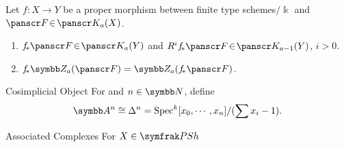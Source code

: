 \begin{proposition}{}{}
	Let $f\colon X\to Y$ be a proper morphism between finite type schemes$/\Bbbk$ and $\fFf\!\in\!\kKk_a(X)$.
	\begin{enumerate}
		\item
				$f_{\str}\fFf\!\in\!\kKk_a(Y)$ and $R^if_{\str}\fFf\!\in\!\kKk_{a-1}(Y)$, $i>0$.
		\item
				$f_{\str}\ZZ_a(\fFf)=\ZZ_a(f_{\str}\fFf)$.
	\end{enumerate}
\end{proposition}

\begin{theorem}{2.8}{}

\end{theorem}
\setcounter{pancounter}{30}
\begin{definition}{Cosimplicial Object}{}
	For and $n\in\NN$, define
	\[
			\AA^n\cong\Delta^n = \Spec^k[x_0, \cdots, x_n]/(\sum x_i-1).
	\]
\end{definition}
\begin{definition}{Associated Complexes}{}
	For $X\in\PSH$
\end{definition}